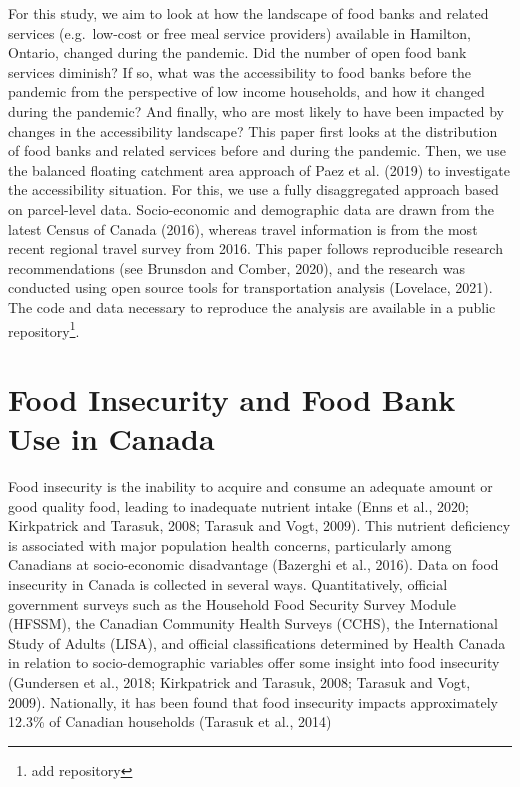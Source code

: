 \documentclass[]{elsarticle} %
\begin{document}
For this study, we aim to look at how the landscape of food banks and
related services (e.g.~low-cost or free meal service providers)
available in Hamilton, Ontario, changed during the pandemic. Did the
number of open food bank services diminish? If so, what was the
accessibility to food banks before the pandemic from the perspective of
low income households, and how it changed during the pandemic? And
finally, who are most likely to have been impacted by changes in the
accessibility landscape? This paper first looks at the distribution of
food banks and related services before and during the pandemic. Then, we
use the balanced floating catchment area approach of Paez et al. (2019)
to investigate the accessibility situation. For this, we use a fully
disaggregated approach based on parcel-level data. Socio-economic and
demographic data are drawn from the latest Census of Canada (2016),
whereas travel information is from the most recent regional travel
survey from 2016. This paper follows reproducible research
recommendations (see Brunsdon and Comber, 2020), and the research was
conducted using open source tools for transportation analysis (Lovelace,
2021). The code and data necessary to reproduce the analysis are
available in a public repository\footnote{add repository}.

\hypertarget{food-insecurity-and-food-bank-use-in-canada}{%
\section{Food Insecurity and Food Bank Use in
Canada}\label{food-insecurity-and-food-bank-use-in-canada}}

Food insecurity is the inability to acquire and consume an adequate
amount or good quality food, leading to inadequate nutrient intake (Enns
et al., 2020; Kirkpatrick and Tarasuk, 2008; Tarasuk and Vogt, 2009).
This nutrient deficiency is associated with major population health
concerns, particularly among Canadians at socio-economic disadvantage
(Bazerghi et al., 2016). Data on food insecurity in Canada is collected
in several ways. Quantitatively, official government surveys such as the
Household Food Security Survey Module (HFSSM), the Canadian Community
Health Surveys (CCHS), the International Study of Adults (LISA), and
official classifications determined by Health Canada in relation to
socio-demographic variables offer some insight into food insecurity
(Gundersen et al., 2018; Kirkpatrick and Tarasuk, 2008; Tarasuk and
Vogt, 2009). Nationally, it has been found that food insecurity impacts
approximately 12.3\% of Canadian households (Tarasuk et al., 2014)
\end{document}
